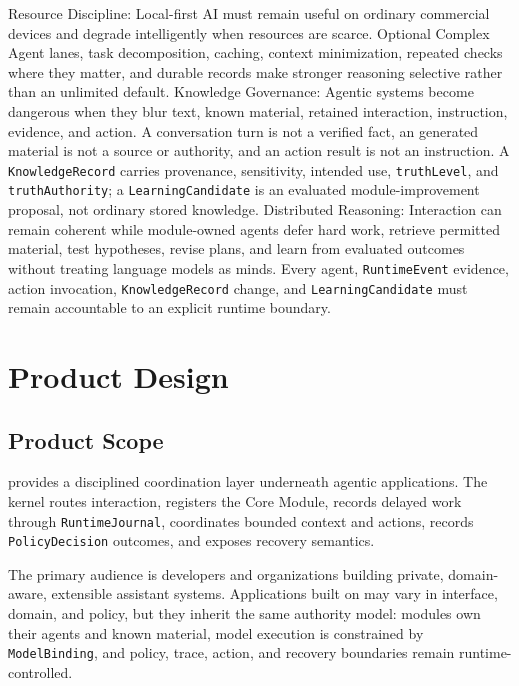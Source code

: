 \begin{itemize}
	\itembf Resource Discipline:
	\subitem Local-first AI must remain useful on ordinary commercial devices and degrade intelligently when resources are scarce.
	\subitem Optional Complex Agent lanes, task decomposition, caching, context minimization, repeated checks where they matter, and durable records make stronger reasoning selective rather than an unlimited default.
	\itembf Knowledge Governance:
	\subitem Agentic systems become dangerous when they blur text, known material, retained interaction, instruction, evidence, and action. A conversation turn is not a verified fact, an generated material is not a source or authority, and an action result is not an instruction.
	\subitem A \texttt{KnowledgeRecord} carries provenance, sensitivity, intended use, \texttt{truthLevel}, and \texttt{truthAuthority}; a \texttt{LearningCandidate} is an evaluated module-improvement proposal, not ordinary stored knowledge.
	\itembf Distributed Reasoning:
	\subitem Interaction can remain coherent while module-owned agents defer hard work, retrieve permitted material, test hypotheses, revise plans, and learn from evaluated outcomes without treating language models as minds.
	\subitem Every agent, \texttt{RuntimeEvent} evidence, action invocation, \texttt{KnowledgeRecord} change, and \texttt{LearningCandidate} must remain accountable to an explicit runtime boundary.
\end{itemize}

\section{Product Design}

\subsection{Product Scope}

\Madre provides a disciplined coordination layer underneath agentic applications. The kernel routes interaction, registers the Core Module, records delayed work through \texttt{RuntimeJournal}, coordinates bounded context and actions, records \texttt{PolicyDecision} outcomes, and exposes recovery semantics.

The primary audience is developers and organizations building private, domain-aware, extensible assistant systems. Applications built on \Madre may vary in interface, domain, and policy, but they inherit the same authority model: modules own their agents and known material, model execution is constrained by \texttt{ModelBinding}, and policy, trace, action, and recovery boundaries remain runtime-controlled.

